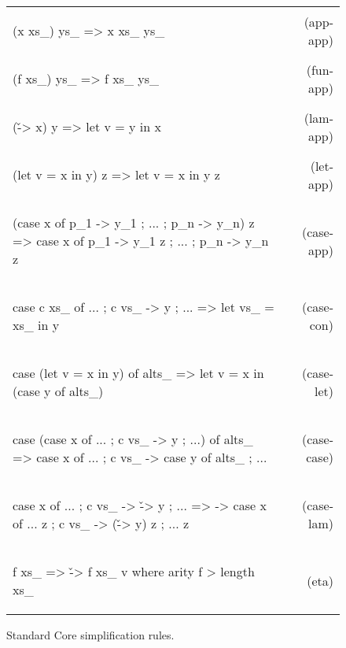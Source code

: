 \documentclass[preprint]{sigplanconf}
\newcommand{\simp}[2]{\begin{minipage}{6.4cm}#2\end{minipage} & (#1) \\}
\newenvironment{simplify}
    {\noindent
     \begin{flushright}
     \begin{tabular}{p{6.5cm}r}
    }
    {\end{tabular}
     \end{flushright}
    }
\begin{document}
\begin{figure}
\begin{simplify}

\simp{app-app}{
\ignore\begin{code}
(x xs_) ys_
    => x xs_ ys_
\end{code}}

\simp{fun-app}{
\ignore\begin{code}
(f xs_) ys_
    => f xs_ ys_
\end{code}}

\simp{lam-app}{
\ignore\begin{code}
(\v -> x) y
    => let v = y in x
\end{code}}

\simp{let-app}{
\ignore\begin{code}
(let v = x in y) z
    => let v = x in y z
\end{code}}

\simp{case-app}{
\ignore\begin{code}
(case x of {p_1 -> y_1 ; ... ; p_n -> y_n}) z
    => case x of {p_1 -> y_1 z ; ... ; p_n -> y_n z}
\end{code}}

\simp{case-con}{
\ignore\begin{code}
case c xs_ of {... ; c vs_ -> y ; ...}
    => let vs_ = xs_ in y
\end{code}}

\simp{case-let}{
\ignore\begin{code}
case (let v = x in y) of alts_
    => let v = x in (case y of alts_)
\end{code}}

\simp{case-case}{
\ignore\begin{code}
case (case x of {... ; c vs_ -> y ; ...}) of alts_
    => case x of {... ; c vs_ -> case y of alts_ ; ...}
\end{code}}

\simp{case-lam}{
\ignore\begin{code}
case x of {... ; c vs_ -> \v -> y ; ...}
    => \z -> case  x of
                   {... z ; c vs_ -> (\v -> y) z ; ... z}
\end{code}}

\simp{eta}{
\ignore\begin{code}
f xs_
    => \v -> f xs_ v
    where arity f > length xs_
\end{code}}

\end{simplify}
\caption{Standard Core simplification rules.}
\label{fig:simplify}
\end{figure}
\end{document}
